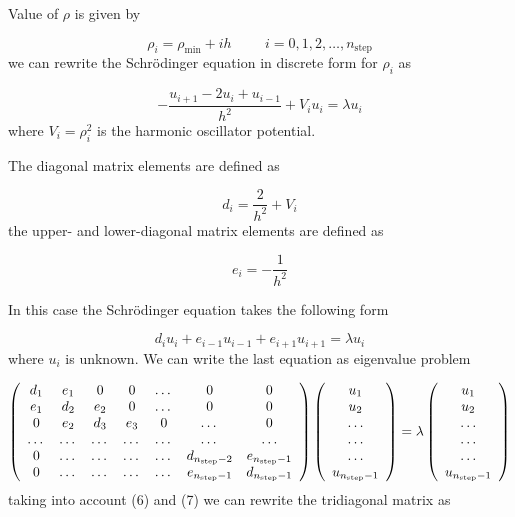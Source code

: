 \documentclass[10pt]{article}
\begin{document}
Value of $\rho $ is given by

\begin{equation}
\rho _{i}=\rho _{\mathrm{min}}+ih\hspace{1cm}i=0,1,2,\dots ,n_{\mathrm{step}}
\end{equation}
we can rewrite the Schr\"{o}dinger equation in discrete form for $\rho _{i}$ as

\begin{equation}
-\frac{u_{i+1}-2u_{i}+u_{i-1}}{h^{2}}+V_{i}u_{i}=\lambda u_{i}
\end{equation}
where $V_{i}=\rho _{i}^{2}$ is the harmonic oscillator potential. 

The diagonal matrix elements are defined as

\begin{equation}
d_{i}=\frac{2}{h^{2}}+V_{i}
\end{equation}
the upper- and lower-diagonal matrix elements are
defined as 

\begin{equation}
e_{i}=-\frac{1}{h^{2}}
\end{equation}

In this case the Schr\"{o}dinger equation takes the following form

\begin{equation}
d_{i}u_{i}+e_{i-1}u_{i-1}+e_{i+1}u_{i+1}=\lambda u_{i}
\end{equation}
where $u_{i}$ is unknown. We can write the last equation as eigenvalue problem

\[
\left( 
\begin{array}{ccccccc}
d_{1} & e_{1} & 0 & 0 & \dots  & 0 & 0 \\ 
e_{1} & d_{2} & e_{2} & 0 & \dots  & 0 & 0 \\ 
0 & e_{2} & d_{3} & e_{3} & 0 & \dots  & 0 \\ 
\dots  & \dots  & \dots  & \dots  & \dots  & \dots  & \dots  \\ 
0 & \dots  & \dots  & \dots  & \dots  & d_{n_{\mathrm{step}}-2} & e_{n_{%
		\mathrm{step}}-1} \\ 
0 & \dots  & \dots  & \dots  & \dots  & e_{n_{\mathrm{step}}-1} & d_{n_{%
		\mathrm{step}}-1}%
\end{array}%
\right) \left( 
\begin{array}{c}
u_{1} \\ 
u_{2} \\ 
\dots  \\ 
\dots  \\ 
\dots  \\ 
u_{n_{\mathrm{step}}-1}%
\end{array}%
\right) =\lambda \left( 
\begin{array}{c}
u_{1} \\ 
u_{2} \\ 
\dots  \\ 
\dots  \\ 
\dots  \\ 
u_{n_{\mathrm{step}}-1}%
\end{array}%
\right) 
\]%
taking into account (6) and (7) we can rewrite the tridiagonal matrix as
\end{document}
